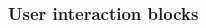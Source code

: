 \documentclass[../main]{subfiles}
\begin{document}
\subsubsection{User interaction blocks}

\begin{varwidth}{0.20\linewidth}
    \begin{scratch}[scale=0.7]
    \end{scratch}
\end{varwidth}%
\hspace{1em}%
\begin{varwidth}{0.28\linewidth}
    \begin{scratch}[scale=0.7]
    \end{scratch}
\end{varwidth}%
\hspace{1em}%
\begin{varwidth}{0.3\linewidth}
    \begin{scratch}[scale=0.7]
    \end{scratch}
\end{varwidth}

\begin{varwidth}{0.5\linewidth}
    \begin{scratch}[scale=0.7]
    \end{scratch}
\end{varwidth}%
\hspace{1em}%
\begin{varwidth}{0.5\linewidth}
    \begin{scratch}[scale=0.7]
    \end{scratch}
\end{varwidth}%

\begin{varwidth}{0.5\linewidth}
    \begin{scratch}[scale=0.7]
    \end{scratch}
\end{varwidth}%
\hspace{1em}%
\begin{varwidth}{0.5\linewidth}
    \begin{scratch}[scale=0.7]
    \end{scratch}
\end{varwidth}%
\end{document}
